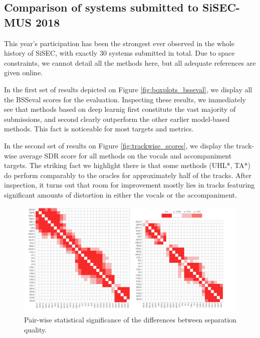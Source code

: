 \documentclass{llncs}
\begin{document}
\subsection{Comparison of systems submitted to SiSEC-MUS 2018}
This year's participation has been the strongest ever observed in the whole history of SiSEC, with exactly $30$ systems submitted in total. Due to space constraints, we cannot detail all the methods here, but all adequate references are given online.%


In the first set of results depicted on Figure \ref{fig:boxplots_bsseval}, we display all the BSSeval scores for the evaluation. Inspecting these results, we immediately see that methods based on deep learnig first constitute the vast majority of submissions, and second clearly outperform the other earlier model-based methods. This fact is noticeable for most targets and metrics.


In the second set of results on Figure \ref{fig:trackwise_scores}, we display the track-wise average SDR score for all methods on the vocals and accompaniment targets. The striking fact we highlight there is that some methods (UHL*, TA*) do perform comparably to the oracles for approximately half of the tracks. After inspection, it turns out that room for improvement mostly lies in tracks featuring significant amounts of distortion in either the vocals or the accompaniment.

\begin{figure}[h]
  \begin{center}
     \includegraphics[width=1\linewidth]{fig/pairwise.pdf}
     \vspace{-1cm}
  \end{center}
  \caption{Pair-wise statistical significance of the differences between separation quality.}
  \label{fig:pairwise_matrix}
\end{figure}
\end{document}

